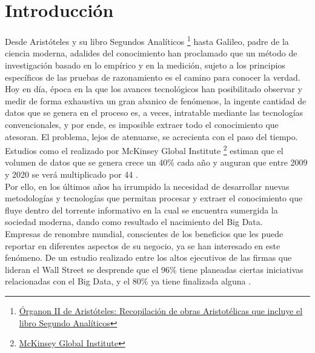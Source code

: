 
\pagestyle{fancy}

\chapter{Introducción}
\label{introduccion}

Desde Aristóteles y su libro Segundos Analíticos \footnote{\href{https://docs.google.com/a/datik.es/file/d/0By4kcbi6MzzdUHhVQnUtcTNUdk0/view}{Órganon II de Aristóteles: Recopilación de obras Aristotélicas que incluye el libro Segundo Analíticos}} hasta Galileo, padre de la ciencia moderna, adalides del conocimiento han proclamado que un método de investigación basado en lo empírico y en la medición, sujeto a los principios específicos de las pruebas de razonamiento es el camino para conocer la verdad.\\

Hoy en día, época en la que los avances tecnológicos han posibilitado observar y medir de forma exhaustiva un gran abanico de fenómenos, la ingente cantidad de datos que se genera en el proceso es, a veces, intratable mediante las tecnologías convencionales, y por ende, es imposible extraer todo el conocimiento que atesoran. El problema, lejos de atenuarse, se acrecienta con el paso del tiempo. Estudios como el realizado por McKinsey Global Institute \footnote{\href{http://www.mckinsey.com/mgi/overview}{McKinsey Global Institute}} estiman que el volumen de datos que se genera crece un 40\% cada año y auguran que entre 2009 y 2020 se verá multiplicado por 44 \cite{nambiartowards}.\\

Por ello, en los últimos años ha irrumpido la necesidad de desarrollar nuevas metodologías y tecnologías que permitan procesar y extraer el conocimiento que fluye dentro del torrente informativo en la cual se encuentra sumergida la sociedad moderna, dando como resultado el nacimiento del Big Data\cite{manyika2011big}.\\

Empresas de renombre mundial, conscientes de los beneficios que les puede reportar en diferentes aspectos de su negocio, ya se han interesado en este fenómeno. De un estudio realizado entre los altos ejecutivos de las firmas que lideran el Wall Street se desprende que el 96\% tiene planeadas ciertas iniciativas relacionadas con el Big Data, y el 80\% ya tiene finalizada alguna \cite{bdes:2013}. 

